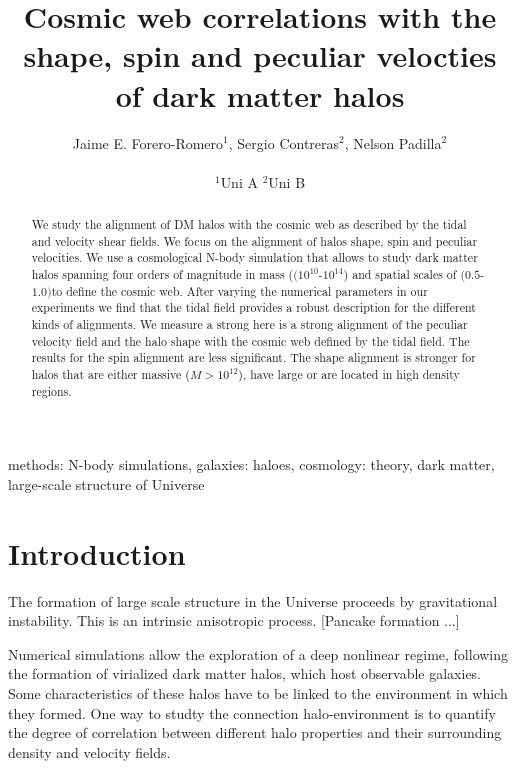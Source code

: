 \documentclass[usenatbib]{mn2e}
\newcommand{\hMpc}{{\ifmmode{h^{-1}{\rm Mpc}}\else{$h^{-1}$Mpc }\fi}}
\newcommand{\hMsun}{{\ifmmode{h^{-1}{\rm
        {M_{\odot}}}}\else{$h^{-1}{\rm{M_{\odot}}}$}\fi}}
\begin{document}
\title[Vweb \& Tweb]{Cosmic web correlations with the shape, spin and
  peculiar velocties of dark matter halos}  
\author[S. Contreras et al.]{
\parbox[t]{\textwidth}{\raggedright 
  Jaime E. Forero-Romero$^{1}$,
  Sergio Contreras$^{2}$,
  Nelson Padilla$^{2}$ 
}
\vspace*{6pt}\\
$^{1}$Uni A
$^{2}$Uni B
}
\maketitle

\begin{abstract}

We study
the alignment of DM halos with the cosmic web as described by the
tidal and velocity shear fields. We focus on the alignment of halos
shape, spin and peculiar velocities. We use a cosmological N-body
simulation that allows to study dark matter halos spanning four orders
of magnitude in mass ($(10^{10}$-$10^{14}$) \hMsun and spatial
scales of $(0.5$-$1.0)$\hMpc to define the cosmic web. After varying
the numerical parameters in our experiments we find that the tidal
field provides a robust description for the different kinds of
alignments.  We measure a strong here is a strong alignment of the
peculiar velocity field and the halo shape with the cosmic web defined
by the tidal field. The results for the spin alignment are less
significant. The shape alignment is stronger for halos that are either
 massive ($M>10^{12}$\hMsun), have large or are located in high
 density regions.  


\end{abstract}
\begin{keywords}
methods: N-body simulations, galaxies: haloes, cosmology: theory, dark
matter, large-scale structure of Universe 
\end{keywords}


\section{Introduction}
\label{sec:introduction}

The formation of large scale structure in the Universe proceeds by
gravitational instability. This is an intrinsic anisotropic
process. [Pancake formation ...] 


Numerical simulations allow the exploration of a deep nonlinear
regime, following the formation of virialized dark matter halos, which
host observable galaxies. Some characteristics of these halos have to
be linked to the environment in which they formed. One way to studty
the connection halo-environment is to quantify the degree of
correlation between different halo properties and their surrounding
density and velocity fields. 
\end{document}
